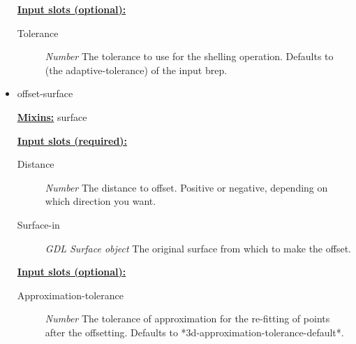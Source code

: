 \documentclass [11pt]{book}
\begin{document}
\begin{itemize}
\begin{description}
\end{description}






\textbf{
\underline{Input slots (optional):}}

\begin{description}

\item [Tolerance]
\emph{Number} The tolerance to use for the shelling operation.
Defaults to (the adaptive-tolerance) of the input brep.


\end{description}







\item {}offset-surface


\textbf{
\underline{Mixins:}} surface





\begin{description}

\end{description}








\textbf{
\underline{Input slots (required):}}

\begin{description}

\item [Distance]
\emph{Number} The distance to offset. Positive or negative, depending on which direction you want.


\item [Surface-in]
\emph{GDL Surface object} The original surface from which to make the offset.


\end{description}






\textbf{
\underline{Input slots (optional):}}

\begin{description}

\item [Approximation-tolerance]
\emph{Number} The tolerance of approximation for the re-fitting of points after the offsetting.
Defaults to *3d-approximation-tolerance-default*.



\end{description}
\end{itemize}
\end{document}
